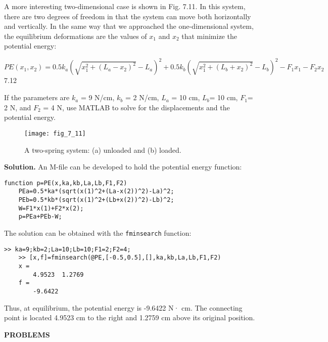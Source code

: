 \documentclass[../main.tex]{subfiles}
\begin{document}
A more interesting two-dimensional case is shown in Fig. 7.11. In this system, there
are two degrees of freedom in that the system can move both horizontally and vertically.
In the same way that we approached the one-dimensional system, the equilibrium deformations
are the values of $x_1$ and $x_2$ that minimize the potential energy: \medskip

$PE(x_1,x_2)=0.5k_a(\sqrt{x_1^2 + (L_a-x_2)^2}-L_a)^2 + 0.5k_b(\sqrt{x_1^2+(L_b+x_2)^2}-L_b)^2-F_1x_1-F_2x_2$ \hfill{7.12}
\smallskip

\noindent If the parameters are $k_a$ = 9 N/cm, $k_b$ = 2 N/cm, $L_a$ = 10 cm, $L_b$= 10 cm, $F_1$= 2 N, and
$F_2$ = 4 N, use MATLAB to solve for the displacements and the potential energy.

\begin{figure}[H]
	\centering
	\texttt{[image: fig\_7\_11]}
	\caption{\textsf{A two-spring system: (a) unloaded and (b) loaded.}}
	\label{fig:fig_7_11}
\end{figure}

\noindent\textbf{Solution.} An M-file can be developed to hold the potential energy function:

\begin{lstlisting}[numbers=none,frame=none]
	function p=PE(x,ka,kb,La,Lb,F1,F2)
	PEa=0.5*ka*(sqrt(x(1)^2+(La-x(2))^2)-La)^2;
	PEb=0.5*kb*(sqrt(x(1)^2+(Lb+x(2))^2)-Lb)^2;
	W=F1*x(1)+F2*x(2);
	p=PEa+PEb-W;
\end{lstlisting}

\noindent The solution can be obtained with the \texttt{fminsearch} function:

\begin{lstlisting}[numbers=none,frame=none]
	>> ka=9;kb=2;La=10;Lb=10;F1=2;F2=4;
	>> [x,f]=fminsearch(@PE,[-0.5,0.5],[],ka,kb,La,Lb,F1,F2)
	x =
		4.9523 	1.2769
	f =
		-9.6422
\end{lstlisting}

Thus, at equilibrium, the potential energy is -9.6422 N· cm. The connecting point is
located 4.9523 cm to the right and 1.2759 cm above its original position.\bigskip
\newpage

\noindent\textbf{PROBLEMS}
\end{document}
